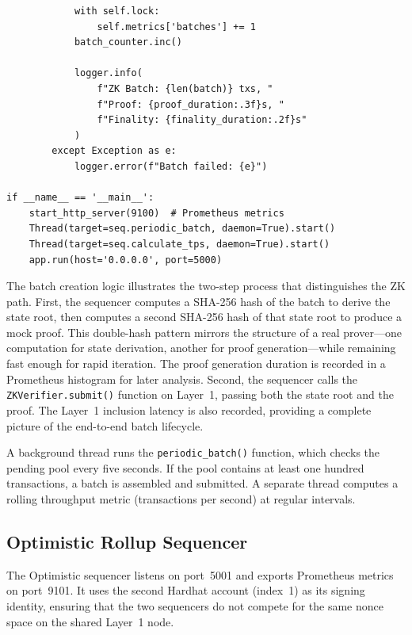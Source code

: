 \begin{listing}[H]
\begin{verbatim}
            with self.lock:
                self.metrics['batches'] += 1
            batch_counter.inc()
            
            logger.info(
                f"ZK Batch: {len(batch)} txs, "
                f"Proof: {proof_duration:.3f}s, "
                f"Finality: {finality_duration:.2f}s"
            )
        except Exception as e:
            logger.error(f"Batch failed: {e}")

if __name__ == '__main__':
    start_http_server(9100)  # Prometheus metrics
    Thread(target=seq.periodic_batch, daemon=True).start()
    Thread(target=seq.calculate_tps, daemon=True).start()
    app.run(host='0.0.0.0', port=5000)
    \end{verbatim}
    \caption{ZK Rollup sequencer - Python implementation}
    \label{lst:zk-sequencer}
\end{listing}

The batch creation logic illustrates the two-step process that distinguishes the ZK path. First, the sequencer computes a SHA-256 hash of the batch to derive the state root, then computes a second SHA-256 hash of that state root to produce a mock proof. This double-hash pattern mirrors the structure of a real prover---one computation for state derivation, another for proof generation---while remaining fast enough for rapid iteration. The proof generation duration is recorded in a Prometheus histogram for later analysis. Second, the sequencer calls the \texttt{ZKVerifier.submit()} function on Layer~1, passing both the state root and the proof. The Layer~1 inclusion latency is also recorded, providing a complete picture of the end-to-end batch lifecycle.

A background thread runs the \texttt{periodic\_batch()} function, which checks the pending pool every five seconds. If the pool contains at least one hundred transactions, a batch is assembled and submitted. A separate thread computes a rolling throughput metric (transactions per second) at regular intervals.

\subsection{Optimistic Rollup Sequencer}

The Optimistic sequencer listens on port~5001 and exports Prometheus metrics on port~9101. It uses the second Hardhat account (index~1) as its signing identity, ensuring that the two sequencers do not compete for the same nonce space on the shared Layer~1 node.

